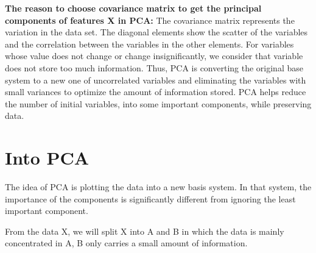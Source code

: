 \documentclass[a4paper, 12pt]{report}
\begin{document}
\textbf{The reason to choose covariance matrix to get the principal components of features X in PCA:}
The covariance matrix represents the variation in the data set. The diagonal elements show the scatter of the variables and the correlation between the variables in the other elements. For variables whose value does not change or change insignificantly, we consider that variable does not store too much information. Thus, PCA is converting the original base system to a new one of uncorrelated variables and eliminating the variables with small variances to optimize the amount of information stored. PCA helps reduce the number of initial variables, into some important components, while preserving data.
\section{Into PCA}
\indent \par The idea of PCA is plotting the data into a new basis system. In that system, the importance of the components is significantly different from ignoring the least important component.

From the data X, we will split X into A and B in which the data is mainly concentrated in A, B only carries a small amount of information.
\end{document}
